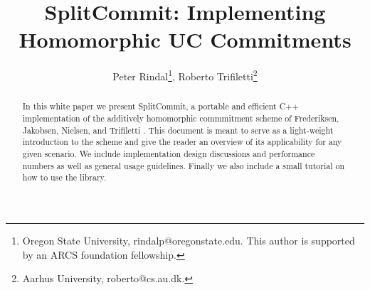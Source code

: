 \documentclass{article}
\begin{document}
	
	\title{SplitCommit: Implementing Homomorphic UC Commitments}
	
	
	\author{
		Peter Rindal\thanks{Oregon State University,  {\sf rindalp@oregonstate.edu}. This author is supported by an ARCS foundation fellowship.}, Roberto  Trifiletti\thanks{Aarhus University, {\sf roberto@cs.au.dk}.}
		}
		
		\maketitle

	
	\begin{abstract}
	In this white paper we present SplitCommit, a portable and efficient C++ implementation of the additively homomorphic commmitment scheme of Frederiksen, Jakobsen, Nielsen, and Trifiletti \cite{DBLP:conf/tcc/FrederiksenJNT16}. This document is meant to serve as a light-weight introduction to the scheme and give the reader an overview of its applicability for any given scenario. We include implementation design discussions and performance numbers as well as general usage guidelines. Finally we also include a small tutorial on how to use the library.

	\end{abstract}
	
	
	\pagestyle{plain}
	
	
	
	
	

	
	
	
	
	
	
	
	
	
	
\end{document}

